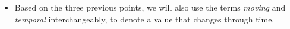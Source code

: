 \begin{itemize}
    \item Based on the three previous points, we will also use the terms \textit{moving} and \textit{temporal} interchangeably, to denote a value that changes through time.
\end{itemize}